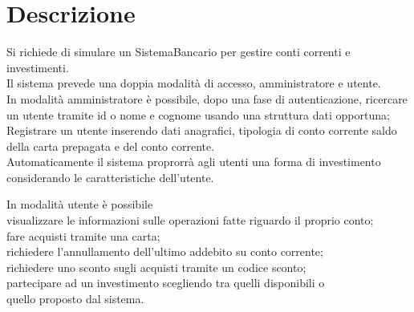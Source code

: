 \chapter{Descrizione} \label{cap1}
Si richiede di simulare un SistemaBancario per gestire conti correnti e investimenti. \\
Il sistema prevede una doppia modalit\`{a} di accesso, amministratore e utente. \\
In modalit\`{a} amministratore \`{e} possibile, dopo una fase di autenticazione, ricercare un utente tramite id o nome e cognome usando una struttura dati opportuna;\\
Registrare un utente inserendo dati anagrafici, tipologia di conto corrente saldo della carta prepagata e del conto corrente.\\
Automaticamente il sistema proprorr\`{a} agli utenti una forma di investimento considerando le caratteristiche dell'utente.

In modalit\`{a} utente \`{e} possibile\\ visualizzare le informazioni sulle operazioni fatte riguardo il proprio conto;\\ fare acquisti tramite una carta;\\
richiedere l'annullamento dell'ultimo addebito su conto corrente;\\ richiedere uno sconto sugli acquisti tramite un codice sconto;\\ partecipare ad un investimento scegliendo tra quelli disponibili o \\ quello proposto dal sistema.